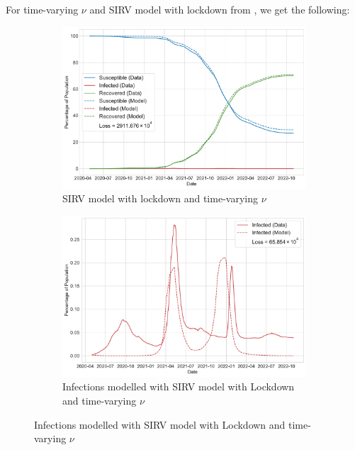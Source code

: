 \documentclass[tikz,fleqn,12pt]{wlscirep}
\begin{document}
For time-varying $\nu$ and SIRV model with lockdown from , we get the following:
\begin{figure}[htbp!]
  \centering
  \caption{SIRV Model with lockdown and time-varying $\nu$ for India}

  \begin{subfigure}[t]{\textwidth}
    \centering
    \includegraphics[scale=0.50]{images/SIRV_model_with_lockdown_time_varying_nu_IND.pdf}
    \caption{SIRV model with lockdown and time-varying $\nu$}
    \label{fig:SIRV_model_with_lockdown_time_varying_nu_IND}
  \end{subfigure}

  \begin{subfigure}[t]{\textwidth}
    \centering
    \includegraphics[scale=0.50]{images/SIRV_model_with_lockdown_infections_time_varying_nu_IND.pdf}
    \caption{Infections modelled with SIRV model with Lockdown and time-varying $\nu$}
    \label{fig:SIRV_model_with_lockdown_infections_time_varying_nu_IND}
  \end{subfigure}
\end{figure}
\end{document}
